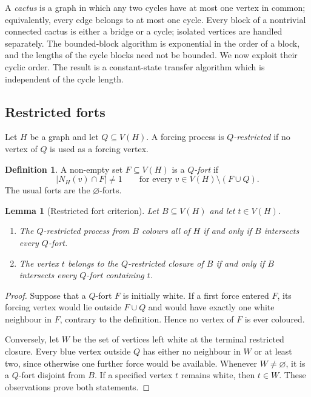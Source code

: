 \documentclass[11pt,reqno]{amsart}
\newtheorem{lemma}[lemma]{Lemma}
\theoremstyle{definition}
\newtheorem{definition}[definition]{Definition}
\begin{document}
A \emph{cactus} is a graph in which any two cycles have at most one vertex in common; equivalently, every edge belongs to at most one cycle.  Every block of a nontrivial connected cactus is either a bridge or a cycle; isolated vertices are handled separately.  The bounded-block algorithm is exponential in the order of a block, and the lengths of the
cycle blocks need not be bounded.  We now exploit their cyclic order.  The result is
a constant-state transfer algorithm which is independent of the cycle length.

\subsection{Restricted forts}

Let $H$ be a graph and let $Q\subseteq V(H)$.  A forcing process is
\emph{$Q$-restricted} if no vertex of $Q$ is used as a forcing vertex.

\begin{definition}
A non-empty set $F\subseteq V(H)$ is a \emph{$Q$-fort} if
\[
  |N_H(v)\cap F|\ne 1
  \qquad
  \text{for every }v\in V(H)\setminus(F\cup Q).
\]
The usual forts are the $\varnothing$-forts.
\end{definition}

\begin{lemma}[Restricted fort criterion]\label{lem:q-fort}
Let $B\subseteq V(H)$ and let $t\in V(H)$.
\begin{enumerate}[label=\textnormal{(\roman*)}]
\item The $Q$-restricted process from $B$ colours all of $H$ if and only if
      $B$ intersects every $Q$-fort.
\item The vertex $t$ belongs to the $Q$-restricted closure of $B$ if and only
      if $B$ intersects every $Q$-fort containing $t$.
\end{enumerate}
\end{lemma}

\begin{proof}
Suppose that a $Q$-fort $F$ is initially white.  If a first force entered
$F$, its forcing vertex would lie outside $F\cup Q$ and would have exactly one
white neighbour in $F$, contrary to the definition.  Hence no vertex of $F$
is ever coloured.

Conversely, let $W$ be the set of vertices left white at the terminal
restricted closure.  Every blue vertex outside $Q$ has either no neighbour in
$W$ or at least two, since otherwise one further force would be available.
Whenever $W\ne\varnothing$, it is a $Q$-fort disjoint from $B$.  If a
specified vertex $t$ remains white, then $t\in W$.  These observations prove
both statements.
\end{proof}
\end{document}
